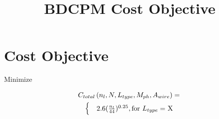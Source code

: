 \documentclass[notitlepage]{article}
\begin{document}
\setlength{\textwidth}{24cm}

\bibpunct{[}{]}{,}{}{:}

\title{BDCPM Cost Objective}

\maketitle

\section{Cost Objective}
Minimize 

\begin{eqnarray*}
\lefteqn{ C_{total} \left(n_{l}, N, L_{type}, M_{ph}, A_{wire} \right) = } \\
& & \begin{cases}
\quad 2.6(\frac{n_{l}}{44})^{0.25}, \text{for $L_{type} =$ X} \\
\end{cases} \\

\end{eqnarray*}
\end{document}

